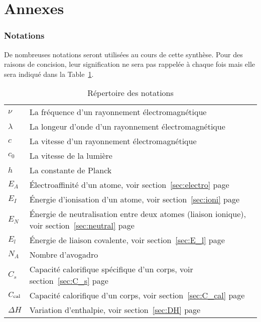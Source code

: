 \part{Annexes}
\begin{appendices}

\section{Notations}
De nombreuses notations seront utilisées au cours de cette synthèse.
Pour des raisons de concision, leur signification ne sera pas rappelée à chaque fois mais elle sera indiqué dans la Table~\ref{tab:notations}.
\begin{table}[h!]
	\begin{center}
		\begin{tabular}{ll}
			$\nu$ & La fréquence d'un rayonnement électromagnétique\\
			$\lambda$ & La longeur d'onde d'un rayonnement électromagnétique\\
			$c$ & La vitesse d'un rayonnement électromagnétique\\
			$c_0$ & La vitesse de la lumière\\
			$h$ & La constante de Planck\\
			$E_A$ & \'Electroaffinité d'un atome,
			voir section~\ref{sec:electro} page~\pageref{sec:electro}\\
			$E_I$ & \'Energie d'ionisation d'un atome,
			voir section~\ref{sec:ioni} page~\pageref{sec:ioni}\\
			$E_N$ & \'Energie de neutralisation entre deux atomes (liaison ionique),
			voir section~\ref{sec:neutral} page~\pageref{sec:neutral}\\
			$E_l$ & \'Energie de liaison covalente,
			voir section~\ref{sec:E_l} page~\pageref{sec:E_l}\\ %
			$N_A$ & Nombre d'avogadro\\
			$C_s$ & Capacité calorifique spécifique d'un corps, voir section~\ref{sec:C_s} page~\pageref{sec:C_s}\\
			$C_\mathrm{cal}$ & Capacité calorifique d'un corps, voir section~\ref{sec:C_cal} page~\pageref{sec:C_cal}\\
			$\Delta H$ & Variation d'enthalpie, voir section~\ref{sec:DH} page~\pageref{sec:DH}
		\end{tabular}
		\caption{Répertoire des notations}
		\label{tab:notations}
	\end{center}
\end{table}


\end{appendices}
